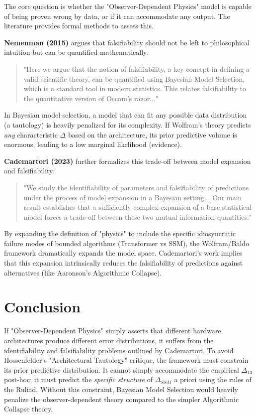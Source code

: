 \documentclass[12pt,a4paper]{article}
\begin{document}
The core question is whether the "Observer-Dependent Physics" model is capable of being proven wrong by data, or if it can accommodate any output. The literature provides formal methods to assess this.

\textbf{Nemenman (2015)} argues that falsifiability should not be left to philosophical intuition but can be quantified mathematically:
\begin{quote}
"Here we argue that the notion of falsifiability, a key concept in defining a valid scientific theory, can be quantified using Bayesian Model Selection, which is a standard tool in modern statistics. This relates falsifiability to the quantitative version of Occam's razor..." \citep{nemenman2015}
\end{quote}

In Bayesian model selection, a model that can fit any possible data distribution (a tautology) is heavily penalized for its complexity. If Wolfram's theory predicts \emph{any} characteristic $\Delta$ based on the architecture, its prior predictive volume is enormous, leading to a low marginal likelihood (evidence).

\textbf{Cademartori (2023)} further formalizes this trade-off between model expansion and falsifiability:
\begin{quote}
"We study the identifiability of parameters and falsifiability of predictions under the process of model expansion in a Bayesian setting... Our main result establishes that a sufficiently complex expansion of a base statistical model forces a trade-off between these two mutual information quantities." \citep{cademartori2023}
\end{quote}

By expanding the definition of "physics" to include the specific idiosyncratic failure modes of bounded algorithms (Transformer vs SSM), the Wolfram/Baldo framework dramatically expands the model space. Cademartori's work implies that this expansion intrinsically reduces the falsifiability of predictions against alternatives (like Aaronson's Algorithmic Collapse).

\section{Conclusion}

If "Observer-Dependent Physics" simply asserts that different hardware architectures produce different error distributions, it suffers from the identifiability and falsifiability problems outlined by Cademartori. To avoid Hossenfelder's "Architectural Tautology" critique, the framework must constrain its prior predictive distribution. It cannot simply accommodate the empirical $\Delta_{13}$ post-hoc; it must predict the \emph{specific structure} of $\Delta_{SSM}$ a priori using the rules of the Ruliad. Without this constraint, Bayesian Model Selection would heavily penalize the observer-dependent theory compared to the simpler Algorithmic Collapse theory.
\end{document}
